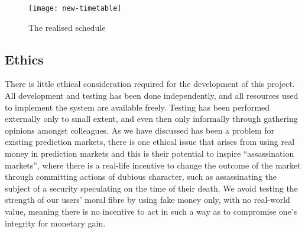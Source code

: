 \begin{figure}[h]
	\centering
	\texttt{[image: new-timetable]}
	\caption{The realised schedule}
	\label{fig:new-timetable}
\end{figure}

\subsection{Ethics}

There is little ethical consideration required for the development of this
project. All development and testing has been done independently, and all
resources used to implement the system are available freely. Testing has been
performed externally only to small extent, and even then only informally
through gathering opinions amongst colleagues. As we have discussed has been a
problem for existing prediction markets, there is one ethical issue that arises
from using real money in prediction markets and this is their potential to
inspire ``assassination markets'', where there is a real-life incentive to
change the outcome of the market through committing actions of dubious
character, such as assassinating the subject of a security speculating on the
time of their death. We avoid testing the strength of our users' moral fibre by
using fake money only, with no real-world value, meaning there is no incentive
to act in such a way as to compromise one's integrity for monetary gain.
